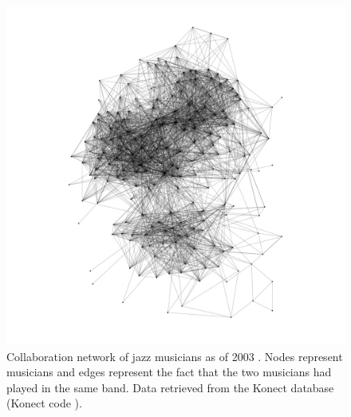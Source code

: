 \documentclass[
11pt, %
american, %
singlespacing, %
final, %
nolistspacing, %
liststotoc, %
headsepline, %
]{MastersDoctoralThesis} %
\begin{document}
\begin{figure}
	\includegraphics[width=\textwidth]{network-arenas-jazz.pdf}
	\caption{Collaboration network of jazz musicians as of 2003 \cite{gleiser2003community}. Nodes represent musicians and edges represent the fact that the two musicians had played in the same band. Data retrieved from the Konect database \cite{kunegis2013konect} (Konect code ).}
	\label{Figure: Network of jazz musicians collaborations}
\end{figure}
\end{document}
